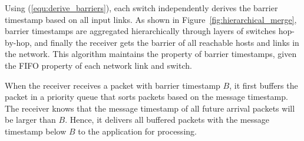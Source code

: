 Using (\ref{equ:derive_barriers}), each switch independently derives the barrier timestamp based on all input links.
As shown in Figure~\ref{fig:hierarchical_merge}, barrier timestamps are aggregated hierarchically through layers of switches hop-by-hop, and finally the receiver gets the barrier of all reachable hosts and links in the network.
This algorithm maintains the property of barrier timestamps, given the FIFO property of each network link and switch.



When the receiver receives a packet with barrier timestamp $B$, it first buffers the packet in a priority queue that sorts packets based on the message timestamp. The receiver knows that the message timestamp of all future arrival packets will be larger than $B$. Hence, it delivers all buffered packets with the message timestamp below $B$ to the application for processing.






